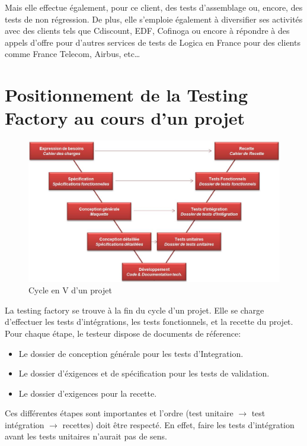 Mais elle effectue également, pour ce client, des tests d’assemblage ou, encore, des tests de non régression. De plus, elle s’emploie également à diversifier ses activités avec des clients tels que Cdiscount, EDF, Cofinoga ou encore à répondre à des appels d’offre pour d’autres services de tests de Logica en France pour des clients comme France Telecom, Airbus, etc…


\section{Positionnement de la Testing Factory au cours d'un projet}

\begin{figure}[h]
  \begin{center}
    \includegraphics[width=15cm]{Images/Cycle_en_V.jpg}
  \end{center}
  \caption{Cycle en V d'un projet}
  \label{Cycle en V d'un projet}
\end{figure}

La testing factory se trouve à la fin du cycle d'un projet. Elle se charge d'effectuer les tests d'intégrations, les tests fonctionnels, et la recette du projet.
Pour chaque étape, le testeur dispose de documents de réference:
\begin{itemize}
\item Le dossier de conception générale pour les tests d'Integration.
\item Le dossier d'éxigences et de spécification pour les tests de validation.
\item Le dossier d'exigences pour la recette.
\end{itemize}

Ces différentes étapes sont importantes et l'ordre (test unitaire $\rightarrow$ test intégration $\rightarrow$ recettes) doit être respecté. En effet, faire les tests d'intégration avant les tests unitaires n'aurait pas de sens.
\clearpage
